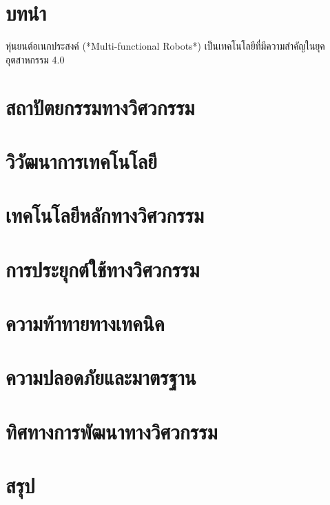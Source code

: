\documentclass[a4paper]{article}
\begin{document}
\newpage

\tableofcontents
\newpage

\section{บทนำ}
หุ่นยนต์อเนกประสงค์ (*Multi-functional Robots*) เป็นเทคโนโลยีที่มีความสำคัญในยุคอุตสาหกรรม 4.0 \parencite{liang2025decoding}


\section{สถาปัตยกรรมทางวิศวกรรม}

\section{วิวัฒนาการเทคโนโลยี}

\section{เทคโนโลยีหลักทางวิศวกรรม}

\section{การประยุกต์ใช้ทางวิศวกรรม}

\section{ความท้าทายทางเทคนิค}

\section{ความปลอดภัยและมาตรฐาน}

\section{ทิศทางการพัฒนาทางวิศวกรรม}

\section{สรุป}

\printbibliography[title=เอกสารอ้างอิง]
\end{document}
